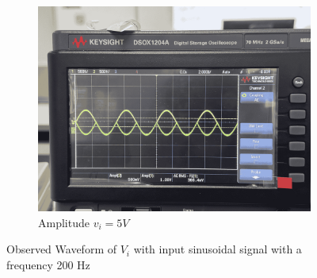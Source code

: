 \begin{figure}[H]
\begin{subfigure}{0.3\linewidth}
            \includegraphics[width=1\linewidth]{Experiment_13/Images/13_5v.jpg}
            \caption{Amplitude $v_i=5V$}
            \label{wave:13-AC5}
        \end{subfigure}

        \caption{Observed Waveform of $V_i$ with input sinusoidal signal with a frequency 200 Hz}
    \end{figure}
    \FloatBarrier


